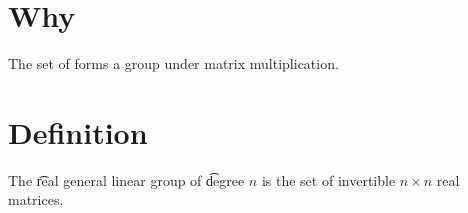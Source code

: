 

\section*{Why}

The set of forms a group under matrix multiplication.

\section*{Definition}

The \t{real general linear group} of \t{degree} $n$ is the set of invertible $n \times  n$ real matrices.

\blankpage
